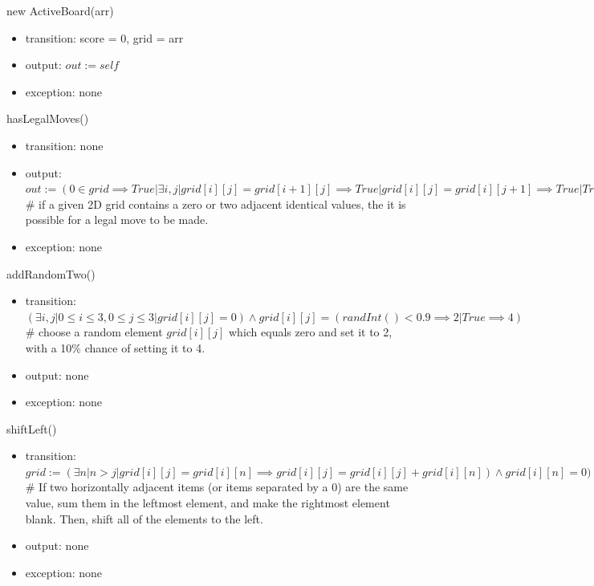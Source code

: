 \documentclass[12pt]{article}
\begin{document}
\noindent new ActiveBoard(arr)
\begin{itemize}
    \item transition: score = 0, grid = arr
    \item output: $out := self$
    \item exception: none
\end{itemize}

\noindent hasLegalMoves()
\begin{itemize}
    \item transition: none
    \item output: $out := (0 \in grid \implies True| \exists i,j | grid[i][j] = grid[i+1][j] \implies True | grid[i][j] = grid[i][j+1] \implies True| True \implies False)$ \\
    \# if a given 2D grid contains a zero or two adjacent identical values, the it is possible for a legal move to be made.
    \item exception: none
\end{itemize}

\noindent addRandomTwo()
\begin{itemize}
    \item transition: $(\exists i,j | 0 \leq i \leq 3,0 \leq j \leq 3 | grid[i][j] = 0) \land grid[i][j] = (randInt() < 0.9 \implies 2 | True \implies 4)$ \\
    \# choose a random element $grid[i][j]$ which equals zero and set it to 2, with a 10\% chance of setting it to 4.
    \item output: none
    \item exception: none
\end{itemize}

\noindent shiftLeft()
\begin{itemize}
    \item transition: $grid := (\exists n | n > j|grid[i][j] = grid[i][n] \implies grid[i][j] = grid[i][j]+grid[i][n]) \land grid[i][n] = 0) \land (\exists m | m > j| grid[i][j] = 0 \land grid[i][m] \neq 0 \implies grid[i][j],grid[i][m] = grid[i][m],grid[i][j])$ \\
    \# If two horizontally adjacent items (or items separated by a 0) are the same value, sum them in the leftmost element, and make the rightmost element blank. Then, shift all of the elements to the left.
    \item output: none
    \item exception: none
\end{itemize}
\end{document}
